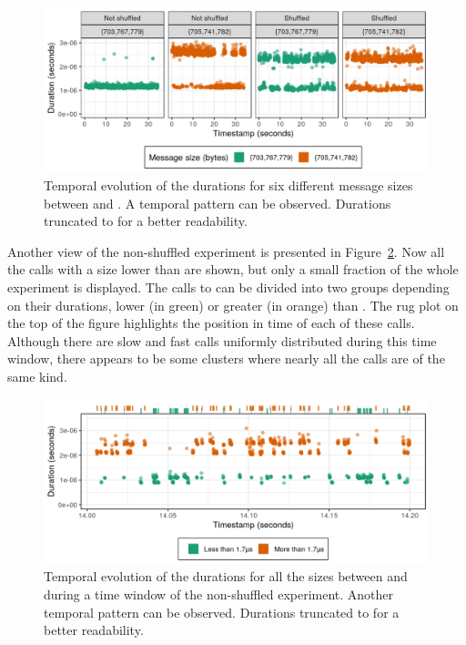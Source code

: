         \begin{figure}[htpb]
            \centering
            \includegraphics[width=\linewidth]{img/experiment/randomizing_order/evolution.png}
            \caption{Temporal evolution of the \recv durations for six different message sizes between 
            and . A temporal pattern can be observed. Durations truncated to  for
            a better readability.}%
            \label{fig:randomizing_order:evolution}
        \end{figure}

        Another view of the non-shuffled experiment is presented in Figure~\ref{fig:randomizing_order:evolution_rug}.
        Now all the calls with a size lower than  are shown, but only a small fraction of the whole
        experiment is displayed. The calls to \recv can be divided into two groups depending on their durations, lower
        (in green) or greater (in orange) than . The rug plot on the top of the figure
        highlights the position in time of each of these \recv calls. Although there are slow and fast calls uniformly
        distributed during this time window, there appears to be some clusters where nearly all the calls are of the
        same kind.

        \begin{figure}[htpb]
            \centering
            \includegraphics[width=\linewidth]{img/experiment/randomizing_order/evolution_rug.png}
            \caption{Temporal evolution of the \recv durations for all the sizes between  and
             during a  time window of the non-shuffled experiment. Another temporal
            pattern can be observed.  Durations truncated to  for a better readability.}%
            \label{fig:randomizing_order:evolution_rug}
        \end{figure}

